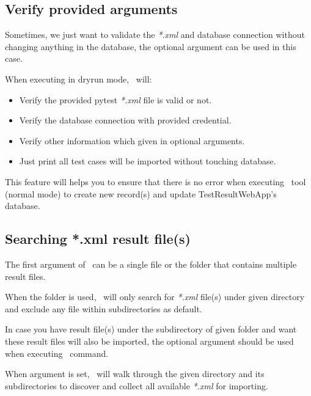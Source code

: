   \hypertarget{verify-provided-arguments}{%
  \subsection{Verify provided arguments}\label{verify-provided-arguments}}

    Sometimes, we just want to validate the \emph{*.xml} and database
    connection without changing anything in the database, the optional
    argument  can be used in this case.

    When executing in dryrun mode, \pkg\ will:

    \begin{itemize}
      \item
        Verify the provided pytest \emph{*.xml} file is valid or not.
      \item
        Verify the database connection with provided credential.
      \item
        Verify other information which given in optional arguments.
      \item
        Just print all test cases will be imported without touching database.
    \end{itemize}

    This feature will helps you to ensure that there is no error when
    executing \pkg\ tool (normal mode) to create new record(s) and
    update TestResultWebApp's database.

  \hypertarget{searching-.xml-result-files}{%
  \subsection{Searching *.xml result file(s)}}
  \label{searching-.xml-result-files}

    The first argument  of \pkg\ can be a single file or the
    folder that contains multiple result files.

    When the folder is used, \pkg\ will only search for \emph{*.xml} file(s)
    under given directory and exclude any file within subdirectories as default.

    In case you have result file(s) under the subdirectory of given folder and
    want these result files will also be imported, the optional argument
     should be used when executing \pkg\ command.

    When  argument is set, \pkg\ will walk through the given
    directory and its subdirectories to discover and collect all available
    \emph{*.xml} for importing.

